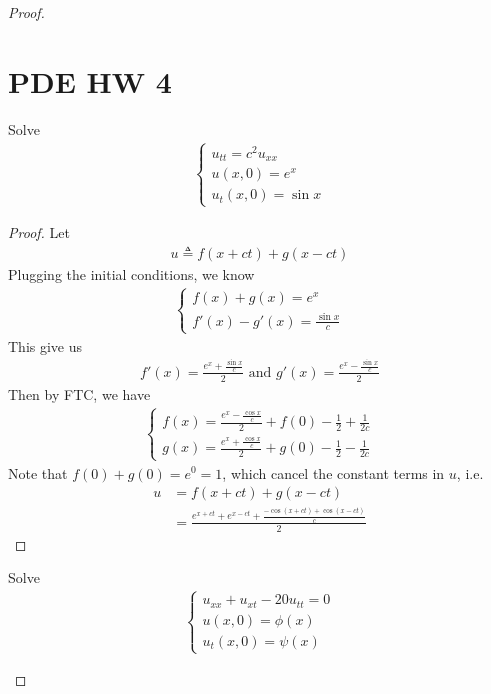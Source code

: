 \documentclass{report}
\begin{document}
\begin{proof}
\section{PDE HW 4}
\begin{question}{}{}
Solve 
\begin{align*}
\begin{cases}
  u_{tt}=c^2u_{xx} \\
  u(x,0)=e^x \\
  u_t(x,0)= \sin x 
\end{cases}
\end{align*}
\end{question}
\begin{proof}
Let 
\begin{align*}
u\triangleq f(x+ct)+g(x-ct)
\end{align*}
Plugging the initial conditions, we know 
\begin{align*}
\begin{cases}
 f(x)+g(x)=e^x \\
 f'(x)-g'(x)= \frac{\sin x}{c} 
\end{cases}
\end{align*}
This give us 
\begin{align*}
f'(x)= \frac{e^x+ \frac{\sin x}{c}}{2}\text{ and }g'(x)= \frac{e^x - \frac{\sin x}{c}}{2}
\end{align*}
Then by FTC, we have
\begin{align*}
\begin{cases}
  f(x)= \frac{e^x-\frac{\cos x}{c}}{2}+f(0)- \frac{1}{2} +\frac{1}{2c} \\
  g(x)= \frac{e^x + \frac{\cos x}{c}}{2} +g(0) - \frac{1}{2}- \frac{1}{2c}
\end{cases}
\end{align*}
Note that $f(0)+g(0)=e^0=1$, which cancel the constant terms in $u$, i.e.
\begin{align*}
u&=f(x+ct)+g(x-ct)\\
&=\frac{e^{x+ct}+ e^{x-ct} + \frac{-\cos (x+ct)+ \cos (x-ct)}{c}}{2}
\end{align*}
\end{proof}
\begin{question}{}{}
Solve 
\begin{align*}
\begin{cases}
u_{xx}+u_{xt}-20u_{tt}=0 \\
u(x,0)=\phi (x) \\
u_t(x,0)= \psi (x)
\end{cases}
\end{align*}

\end{question}
\end{proof}
\end{document}
